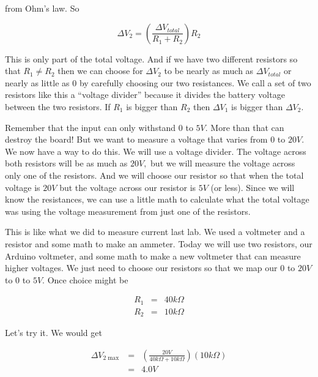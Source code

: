 \noindent from Ohm's law. So

\begin{equation*}
	\Delta V_{2}=\left( \frac{\Delta V_{total}}{R_{1}+R_{2}}\right) R_{2}
\end{equation*}

This is only part of the total voltage. And if we have two different resistors so that $R_{1}\neq R_{2}$ then we can choose for $\Delta V_{2}$ to be nearly as much as $\Delta V_{total}$ or nearly as little as $0$ by carefully choosing our two resistances. We call a set of two resistors like this a ``voltage divider'' because it divides the battery voltage between the two resistors. If $R_{1}$ is bigger than $R_{2}$ then $\Delta V_{1}$ is bigger than $\Delta V_{2}.$

Remember that the input can only withstand $0$ to $5\unit{V}.$ More than that can destroy the board! But we want to measure a voltage that varies from $0$ to $20\unit{V}.$ We now have a way to do this. We will use a voltage divider. The voltage across both resistors will be as much as $20\unit{V},$ but we will measure the voltage across only one of the resistors. And we will choose our resistor so that when the total voltage is $20\unit{V} $ but the voltage across our resistor is $5\unit{V}$ (or less). Since we will know the resistances, we can use a little math to calculate what the total voltage was using the voltage measurement from just one of the resistors.

This is like what we did to measure current last lab. We used a voltmeter and a resistor and some math to make an ammeter. Today we will use two resistors, our Arduino voltmeter, and some math to make a new voltmeter that can measure higher voltages. We just need to choose our resistors so that we
map our $0$ to $20\unit{V}$ to $0$ to $5\unit{V}.$ Once choice might be 

\begin{eqnarray*}
	R_{1} &=&40\unit{k \Omega} \\
	R_{2} &=&10\unit{k \Omega}
\end{eqnarray*}

\noindent Let's try it. We would get

\begin{eqnarray*}
	\Delta V_{2\max } &=&\left( \frac{20\unit{V}}{40\unit{k \Omega }
	+10\unit{k \Omega }}\right) \left( 10\unit{k \Omega }\right) \\
	&=&4.0\unit{V}
\end{eqnarray*}

